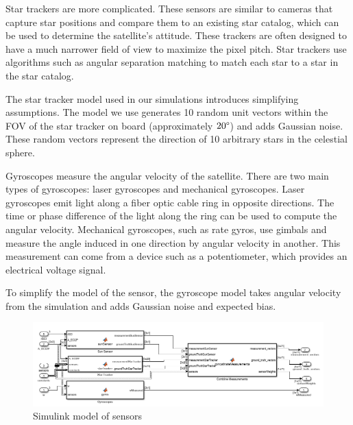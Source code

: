 Star trackers are more complicated. These sensors are similar to cameras that capture star positions and compare them to an existing star catalog, which can be used to determine the satellite's attitude. These trackers are often designed to have a much narrower field of view to maximize the pixel pitch. Star trackers use algorithms such as angular separation matching to match each star to a star in the star catalog.

The star tracker model used in our simulations introduces simplifying assumptions. The model we use generates 10 random unit vectors within the FOV of the star tracker on board (approximately $20 \degree$) and adds Gaussian noise. These random vectors represent the direction of 10 arbitrary stars in the celestial sphere.

Gyroscopes measure the angular velocity of the satellite. There are two main types of gyroscopes: laser gyroscopes and mechanical gyroscopes. Laser gyroscopes emit light along a fiber optic cable ring in opposite directions. The time or phase difference of the light along the ring can be used to compute the angular velocity. Mechanical gyroscopes, such as rate gyros, use gimbals and measure the angle induced in one direction by angular velocity in another. This measurement can come from a device such as a potentiometer, which provides an electrical voltage signal.

To simplify the model of the sensor, the gyroscope model takes angular velocity from the simulation and adds Gaussian noise and expected bias.

\begin{figure}[H]
\centering
\includegraphics[scale=0.59]{Images/ps7_problem4_simulink.png}
\caption{Simulink model of sensors}
\label{fig:ps7_problem4_simulink}
\end{figure}

